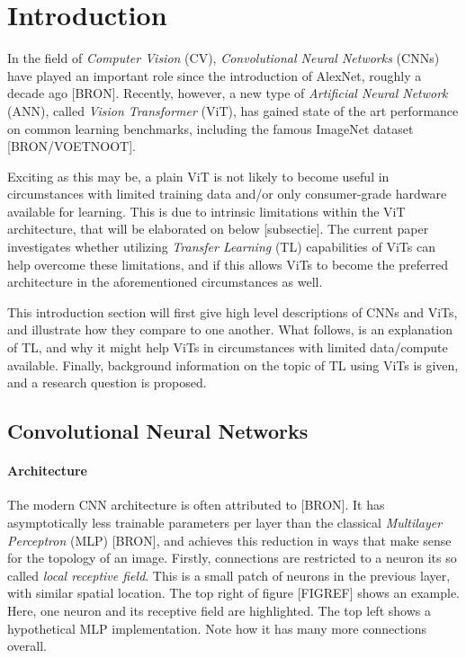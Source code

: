 \section{Introduction}
In the field of \textit{Computer Vision} (CV), \textit{Convolutional Neural Networks} (CNNs) have played an important role since the introduction of AlexNet, roughly a decade ago [BRON]. Recently, however, a new type of \textit{Artificial Neural Network} (ANN), called \textit{Vision Transformer} (ViT), has gained state of the art performance on common learning benchmarks, including the famous ImageNet dataset [BRON/VOETNOOT].

Exciting as this may be, a plain ViT is not likely to become useful in circumstances with limited training data and/or only consumer-grade hardware available for learning. This is due to intrinsic limitations within the ViT architecture, that will be elaborated on below [subsectie]. The current paper investigates whether utilizing \textit{Transfer Learning} (TL) capabilities of ViTs can help overcome these limitations, and if this allows ViTs to become the preferred architecture in the aforementioned circumstances as well.

This introduction section will first give high level descriptions of CNNs and ViTs, and illustrate how they compare to one another. What follows, is an explanation of TL, and why it might help ViTs in circumstances with limited data/compute available. Finally, background information on the topic of TL using ViTs is given, and a research question is proposed.

\subsection{Convolutional Neural Networks}
\paragraph{Architecture}
The modern CNN architecture is often attributed to [BRON]. It has asymptotically less trainable parameters per layer than the classical \textit{Multilayer Perceptron} (MLP) [BRON], and achieves this reduction in ways that make sense for the topology of an image. Firstly, connections are restricted to a neuron its so called \textit{local receptive field}. This is a small patch of neurons in the previous layer, with similar spatial location. The top right of figure [FIGREF] shows an example. Here, one neuron and its receptive field are highlighted. The top left shows a hypothetical MLP implementation. Note how it has many more connections overall.

